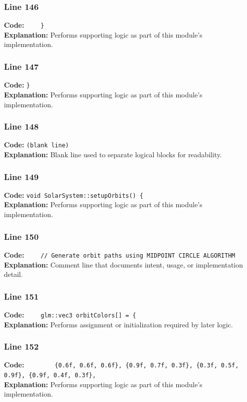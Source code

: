 \documentclass[11pt,a4paper]{article}
\begin{document}
\subsubsection*{Line 146}
\textbf{Code:} \verb|    }|\\
\textbf{Explanation:} Performs supporting logic as part of this module's implementation.

\subsubsection*{Line 147}
\textbf{Code:} \verb|}|\\
\textbf{Explanation:} Performs supporting logic as part of this module's implementation.

\subsubsection*{Line 148}
\textbf{Code:} \texttt{(blank line)}\\
\textbf{Explanation:} Blank line used to separate logical blocks for readability.

\subsubsection*{Line 149}
\textbf{Code:} \verb|void SolarSystem::setupOrbits() {|\\
\textbf{Explanation:} Performs supporting logic as part of this module's implementation.

\subsubsection*{Line 150}
\textbf{Code:} \verb|    // Generate orbit paths using MIDPOINT CIRCLE ALGORITHM|\\
\textbf{Explanation:} Comment line that documents intent, usage, or implementation detail.

\subsubsection*{Line 151}
\textbf{Code:} \verb|    glm::vec3 orbitColors[] = {|\\
\textbf{Explanation:} Performs assignment or initialization required by later logic.

\subsubsection*{Line 152}
\textbf{Code:} \verb|        {0.6f, 0.6f, 0.6f}, {0.9f, 0.7f, 0.3f}, {0.3f, 0.5f, 0.9f}, {0.9f, 0.4f, 0.3f},|\\
\textbf{Explanation:} Performs supporting logic as part of this module's implementation.
\end{document}
